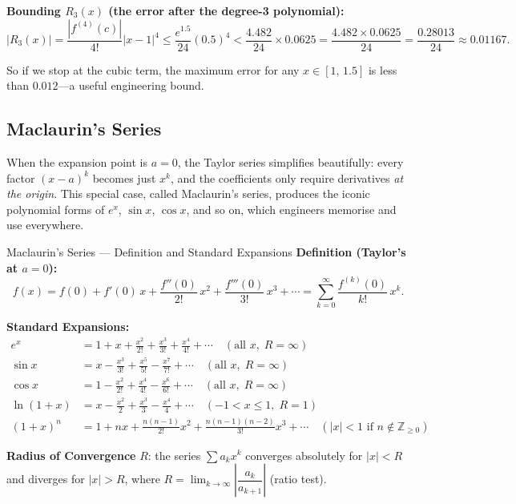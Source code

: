 \documentclass[12pt,a4paper]{article}
\begin{document}
\textbf{Bounding \(R_3(x)\) (the error after the degree-3 polynomial):}
\[
  |R_3(x)| = \frac{|f^{(4)}(c)|}{4!}|x-1|^4
            \leq \frac{e^{1.5}}{24}(0.5)^4
            < \frac{4.482}{24} \times 0.0625
            = \frac{4.482 \times 0.0625}{24}
            = \frac{0.28013}{24}
            \approx 0.01167.
\]

So if we stop at the cubic term, the maximum error for any \(x \in [1,\,1.5]\) is less than
\(0.012\)---a useful engineering bound.

\subsection{Maclaurin's Series}

When the expansion point is \(a = 0\), the Taylor series simplifies beautifully: every
factor \((x-a)^k\) becomes just \(x^k\), and the coefficients only require derivatives
\emph{at the origin}.
This special case, called Maclaurin's series, produces the iconic polynomial forms of
\(e^x\), \(\sin x\), \(\cos x\), and so on, which engineers memorise and use everywhere.

\begin{infobox}{Maclaurin's Series --- Definition and Standard Expansions}
\textbf{Definition (Taylor's at \(a = 0\)):}
\[
  f(x) = f(0) + f'(0)\,x + \frac{f''(0)}{2!}\,x^2 + \frac{f'''(0)}{3!}\,x^3 + \cdots
         = \sum_{k=0}^{\infty} \frac{f^{(k)}(0)}{k!}\,x^k.
\]

\textbf{Standard Expansions:}
\begin{align*}
  e^x         &= 1 + x + \frac{x^2}{2!} + \frac{x^3}{3!} + \frac{x^4}{4!} + \cdots
                 \quad (\text{all } x,\; R = \infty) \\[4pt]
  \sin x      &= x - \frac{x^3}{3!} + \frac{x^5}{5!} - \frac{x^7}{7!} + \cdots
                 \quad (\text{all } x,\; R = \infty) \\[4pt]
  \cos x      &= 1 - \frac{x^2}{2!} + \frac{x^4}{4!} - \frac{x^6}{6!} + \cdots
                 \quad (\text{all } x,\; R = \infty) \\[4pt]
  \ln(1+x)    &= x - \frac{x^2}{2} + \frac{x^3}{3} - \frac{x^4}{4} + \cdots
                 \quad (-1 < x \leq 1,\; R = 1) \\[4pt]
  (1+x)^n     &= 1 + nx + \frac{n(n-1)}{2!}x^2 + \frac{n(n-1)(n-2)}{3!}x^3 + \cdots
                 \quad (|x| < 1 \text{ if } n \notin \mathbb{Z}_{\geq 0})
\end{align*}

\textbf{Radius of Convergence} \(R\): the series \(\sum a_k x^k\) converges absolutely for
\(|x| < R\) and diverges for \(|x| > R\), where
\(R = \lim_{k\to\infty} \left|\dfrac{a_k}{a_{k+1}}\right|\) (ratio test).
\end{infobox}
\end{document}
